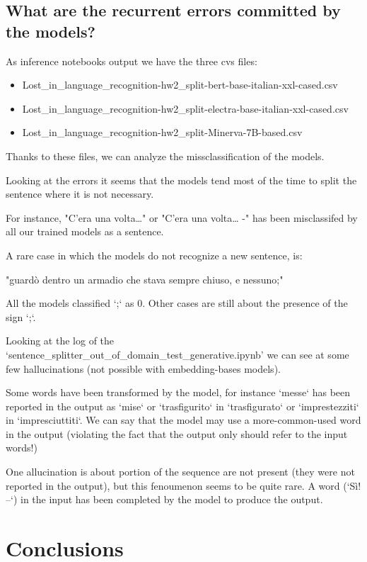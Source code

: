 \documentclass[11pt]{article}
\begin{document}
\subsection{What are the recurrent errors committed by the models?}

As inference notebooks output we have the three cvs files:

\begin{itemize}
 	\item Lost\_in\_language\_recognition-hw2\_split-bert-base-italian-xxl-cased.csv
	\item Lost\_in\_language\_recognition-hw2\_split-electra-base-italian-xxl-cased.csv
	\item Lost\_in\_language\_recognition-hw2\_split-Minerva-7B-based.csv
\end{itemize}

Thanks to these files, we can analyze the missclassification of the models.

Looking at the errors it seems that the models tend most of the
time to split the sentence where it is not necessary.

For instance, "C'era una volta…" or "C'era una volta… -" has been misclassifed by all our
trained models as a sentence.

A rare case in which the models do not recognize a new sentence, is:

"guardò dentro un armadio che stava sempre chiuso, e nessuno;"

All the models classified `;` as 0. Other cases are still about
the presence of the sign `;`.

Looking at the log of the `sentence\_splitter\_out\_of\_domain\_test\_generative.ipynb'
we can see at some few hallucinations (not possible with embedding-bases models).

Some words have been transformed by the model, for instance 
`messe` has been reported in the output as `mise` or `trasfigurito`
in `trasfigurato` or `imprestezziti` in `impresciuttiti`. We can say that the model may use
a more-common-used word in the output (violating the fact that
the output only should refer to the input words!)

One allucination is about portion of the sequence
are not present (they were not reported in the output),
but this fenoumenon seems to be quite rare.
A word (`Sì! –`) in the input has been completed 
by the model to produce the output.

\section{Conclusions}
\end{document}
